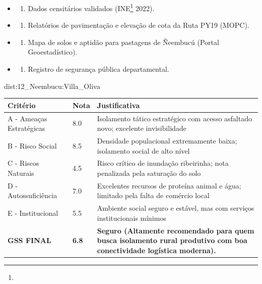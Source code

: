 {\begin{itemize}
\tightlist
\item
  \begin{enumerate}
  \def\labelenumi{\arabic{enumi})}
  \tightlist
  \item
    Dados censitários validados (INE\footnote{\fineINE} 2022).
  \end{enumerate}
\item
  \begin{enumerate}
  \def\labelenumi{\arabic{enumi})}
  \setcounter{enumi}{1}
  \tightlist
  \item
    Relatórios de pavimentação e elevação de cota da Ruta PY19 (MOPC).
  \end{enumerate}
\item
  \begin{enumerate}
  \def\labelenumi{\arabic{enumi})}
  \setcounter{enumi}{2}
  \tightlist
  \item
    Mapa de solos e aptidão para pastagens de Ñeembucú (Portal
    Geoestadístico).
  \end{enumerate}
\item
  \begin{enumerate}
  \def\labelenumi{\arabic{enumi})}
  \setcounter{enumi}{3}
  \tightlist
  \item
    Registro de segurança pública departamental.
  \end{enumerate}
\end{itemize}}{dist:12_Neembucu:Villa_Oliva}
\begin{table}[ht!]
\small \begin{tabular}{p{3.0cm}p{0.8cm}p{6.0cm}} \toprule
\textbf{Critério} & \textbf{Nota} & \textbf{Justificativa} \\ \midrule
A - Ameaças Estratégicas & 8.0 & Isolamento tático estratégico com acesso asfaltado novo; excelente invisibilidade \\
B - Risco Social & 8.5 & Densidade populacional extremamente baixa; isolamento social de alto nível \\
C - Riscos Naturais & 4.5 & Risco crítico de inundação ribeirinha; nota penalizada pela saturação do solo \\
D - Autossuficiência & 7.0 & Excelentes recursos de proteína animal e água; limitado pela falta de comércio local \\
E - Institucional & 5.5 & Ambiente social seguro e estável, mas com serviços institucionais mínimos \\
\midrule \textbf{GSS FINAL} & \textbf{6.8} & \textbf{Seguro (Altamente recomendado para quem busca isolamento rural produtivo com boa conectividade logística moderna).} \\ \bottomrule \end{tabular}
\end{table}
